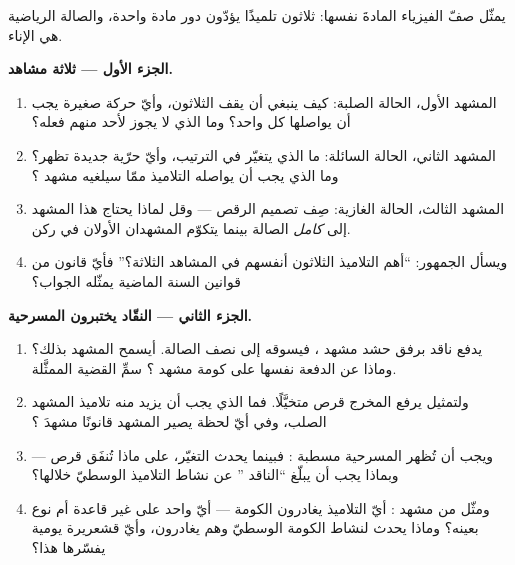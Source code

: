 \begin{problem}\label{pb:g7:states-of-matter:1}
يمثّل صفّ الفيزياء المادةَ نفسها: ثلاثون تلميذًا يؤدّون دور
 مادة واحدة، والصالة الرياضية هي الإناء.

\medskip\noindent\textbf{الجزء الأول --- ثلاثة مشاهد.}
\begin{enumerate}
  \item المشهد الأول، الحالة الصلبة: كيف ينبغي أن يقف
        الثلاثون، وأيّ حركة صغيرة يجب أن يواصلها كل واحد؟ وما
        الذي لا يجوز لأحد منهم فعله؟
  \item المشهد الثاني، الحالة السائلة: ما الذي يتغيّر في
        الترتيب، وأيّ حرّية جديدة تظهر؟ وما الذي يجب أن يواصله
        التلاميذ ممّا سيلغيه مشهد ؟
  \item المشهد الثالث، الحالة الغازية: صِف تصميم الرقص ---
        وقل لماذا يحتاج هذا المشهد إلى \emph{كامل} الصالة بينما
        يتكوّم المشهدان الأولان في ركن.
  \item ويسأل الجمهور: ``أهم التلاميذ الثلاثون أنفسهم في
        المشاهد الثلاثة؟'' فأيّ قانون من قوانين السنة الماضية
        يمثّله الجواب؟
\end{enumerate}

\medskip\noindent\textbf{الجزء الثاني --- النقّاد يختبرون
المسرحية.}
\begin{enumerate}[resume]
  \item يدفع ناقد برفق حشد مشهد ، فيسوقه إلى نصف الصالة.
        أيسمح المشهد بذلك؟ وماذا عن الدفعة نفسها على كومة مشهد
        ؟ سمِّ القضية الممثَّلة.
  \item ولتمثيل \emph{} يرفع المخرج قرص 
        متخيَّلًا. فما الذي يجب أن يزيد منه تلاميذ المشهد
        الصلب، وفي أيّ لحظة يصير المشهد قانونًا مشهدَ
        ؟
  \item ويجب أن تُظهر المسرحية مسطبة : فبينما يحدث
        التغيّر، على ماذا تُنفَق  قرص  --- وبماذا
        يجب أن يبلّغ ``الناقد '' عن نشاط التلاميذ
        الوسطيّ خلالها؟
  \item ومثّل  من مشهد : أيّ التلاميذ يغادرون
        الكومة --- أيّ واحد على غير قاعدة أم نوع بعينه؟ وماذا
        يحدث لنشاط الكومة الوسطيّ وهم يغادرون، وأيّ قشعريرة
        يومية يفسّرها هذا؟
\end{enumerate}


\end{problem}
